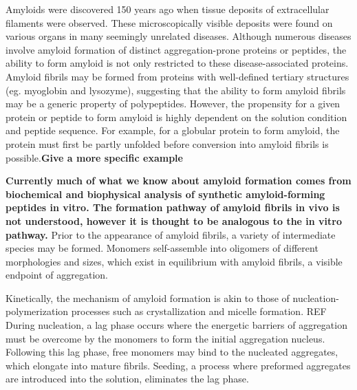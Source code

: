 Amyloids were discovered 150 years ago when tissue deposits of extracellular filaments were observed.\cite{Haass:2007db,Sipe:2000fs} These microscopically visible deposits were found on various organs in many seemingly unrelated diseases. 
Although numerous diseases involve amyloid formation of distinct aggregation-prone proteins or peptides, the ability to form amyloid is not only restricted to these disease-associated proteins. Amyloid fibrils may be formed from proteins with well-defined tertiary structures (eg. myoglobin and lysozyme), suggesting that the ability to form amyloid fibrils may be a generic property of polypeptides.\cite{Chiti:2006fz} However, the propensity for a given protein or peptide to form amyloid is highly dependent on the solution condition and peptide sequence. For example, for a globular protein to form amyloid, the protein must first be partly unfolded before conversion into amyloid fibrils is possible.\cite{Chiti:2006fz}\textbf{Give a more specific example}

\textbf{Currently much of what we know about amyloid formation comes from biochemical and biophysical analysis of synthetic amyloid-forming peptides in vitro. The formation pathway of amyloid fibrils in vivo is not understood, however it is thought to be analogous to the in vitro pathway.} Prior to the appearance of amyloid fibrils, a variety of intermediate species may be formed.  Monomers self-assemble into oligomers of different morphologies and sizes, which exist in equilibrium with amyloid fibrils, a visible endpoint of aggregation. 

Kinetically, the mechanism of amyloid formation is akin to those of nucleation-polymerization processes such as crystallization and micelle formation. REF
During nucleation, a lag phase occurs where the energetic barriers of aggregation must be overcome by the monomers to form the initial aggregation nucleus.\cite{Murphy:2002fe} Following this lag phase, free monomers may bind to the nucleated aggregates, which elongate into mature fibrils.\cite{Murphy:2002fe} Seeding, a process where preformed aggregates are introduced into the solution, eliminates the lag phase.\cite{Harper:1997ix,Jarrett:1993vm} 

